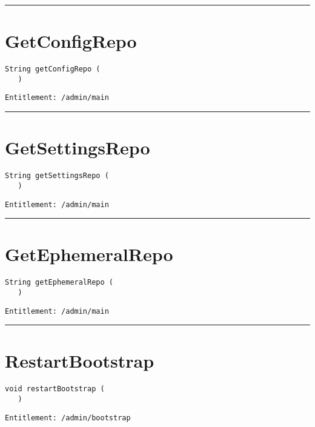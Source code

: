 \rule{12cm}{2pt}
\section{GetConfigRepo}
\label{Api:GetConfigRepo}
\begin{lstlisting}[style=nonumbers]
   String getConfigRepo (
   )
\end{lstlisting}
\begin{Verbatim}[formatcom=\color{Maroon}]
  Entitlement: /admin/main
\end{Verbatim}



\rule{12cm}{2pt}
\section{GetSettingsRepo}
\label{Api:GetSettingsRepo}
\begin{lstlisting}[style=nonumbers]
   String getSettingsRepo (
   )
\end{lstlisting}
\begin{Verbatim}[formatcom=\color{Maroon}]
  Entitlement: /admin/main
\end{Verbatim}



\rule{12cm}{2pt}
\section{GetEphemeralRepo}
\label{Api:GetEphemeralRepo}
\begin{lstlisting}[style=nonumbers]
   String getEphemeralRepo (
   )
\end{lstlisting}
\begin{Verbatim}[formatcom=\color{Maroon}]
  Entitlement: /admin/main
\end{Verbatim}



\rule{12cm}{2pt}
\section{RestartBootstrap}
\label{Api:RestartBootstrap}
\begin{lstlisting}[style=nonumbers]
   void restartBootstrap (
   )
\end{lstlisting}
\begin{Verbatim}[formatcom=\color{Maroon}]
  Entitlement: /admin/bootstrap
\end{Verbatim}




